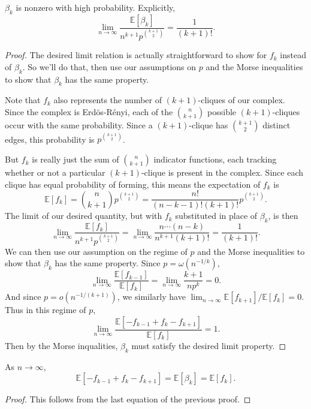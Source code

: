 \documentclass[twoside,10pt]{report}
\begin{document}
\newpage

\begin{thrm}[]
	$\beta_{k}$ is nonzero with high probability. Explicitly,
\[
	\lim_{n \to \infty} \frac{\mathbb{E}[\beta_{k}]}{n^{k+1}p^{\binom{k+1}{2}}} = \frac{1}{(k+1)!} .
\] 
\end{thrm}
\begin{proof}
	The desired limit relation is actually straightforward to show for $f_{k}$ instead of $\beta_{k}$. So we'll do that, then use our assumptions on $p$ and the Morse inequalities to show that $\beta_{k}$ has the same property.

	Note that $f_{k}$ also represents the number of $(k+1)$-cliques of our complex. Since the complex is Erd\"os-R\'enyi, each of the $\binom{n}{k+1}$ possible $(k+1)$-cliques occur with the same probability. Since a $(k+1)$-clique has $\binom{k+1}{2}$ distinct edges, this probability is $p^{\binom{k+1}{2}}$.

	But $f_k$ is really just the sum of $\binom{n}{k+1}$ indicator functions, each tracking whether or not a particular $(k+1)$-clique is present in the complex. Since each clique has equal probability of forming, this means the expectation of $f_{k}$ is
	\[
		\mathbb{E}[f_{k}] = \binom{n}{k+1}p^{\binom{k+1}{2}} = \frac{n!}{(n-k-1)!(k+1)!} p^{\binom{k+1}{2}}.
	\] The limit of our desired quantity, but with $f_{k}$ substituted in place of $\beta_{k}$, is then
	\[
		\lim_{n \to \infty} \frac{\mathbb{E}[f_{k}]}{n^{k+1}p^{\binom{k+1}{2}}} = \lim_{n \to \infty} \frac{n \cdots (n-k)}{n^{k+1}(k+1)!} = \frac{1}{(k+1)!}.
	\] 
	We can then use our assumption on the regime of $p$ and the Morse inequalities to show that $\beta_{k}$ has the same property. Since $p = \omega(n^{-1/k})$,
	\[
		\lim_{n \to \infty} \frac{\mathbb{E}[f_{k-1}]}{\mathbb{E}[f_k]} = \lim_{n \to \infty} \frac{k+1}{n p^{k}} = 0.
	\] And since $p= o(n^{-1/(k+1)})$, we similarly have $\lim_{n \to \infty} \mathbb{E}\left[ f_{k+1} \right] / \mathbb{E}\left[ f_{k} \right] =0$. Thus in this regime of $p$,
	\[
	\lim_{n \to \infty} \frac{\mathbb{E}\left[ -f_{k-1}+f_{k}-f_{k+1} \right]}{\mathbb{E}\left[ f_{k} \right]}=1.
	\] 
	Then by the Morse inqualities, $\beta_{k}$ must satisfy the desired limit property.
\end{proof}

\begin{cor}
\label{cor:morse-exp}
As $n\to \infty$,
\[
\mathbb{E}\left[ -f_{k-1}+f_{k}-f_{k+1} \right] = \mathbb{E}\left[ \beta_{k} \right] = \mathbb{E}\left[ f_{k} \right].
\] 
\end{cor}
\begin{proof}
	This follows from the last equation of the previous proof.
\end{proof}
\end{document}
